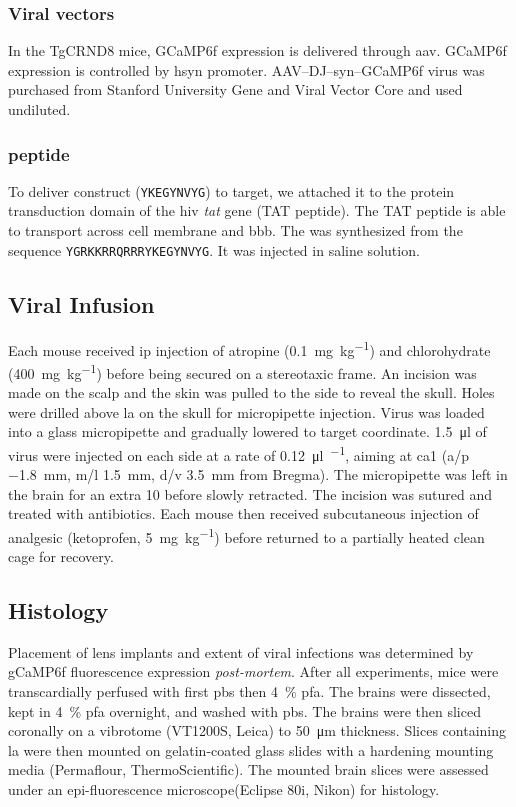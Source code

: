 \subsubsection{Viral vectors}
In the TgCRND8 mice, GCaMP6f expression is delivered through \gls{aav}. GCaMP6f expression is controlled by \gls{hsyn} promoter. AAV--DJ--syn--GCaMP6f virus was purchased from Stanford University Gene and Viral Vector Core and used undiluted. 

\subsubsection{\tglu{} peptide}
To deliver \glu{} construct (\texttt{YKEGYNVYG}) to target, we attached it to the protein transduction domain of the \gls{hiv} \textit{tat} gene (TAT peptide). The TAT peptide is able to transport across cell membrane and \gls{bbb}. The \tglu{} was synthesized from the sequence \texttt{YGRKKRRQRRRYKEGYNVYG}. It was injected in saline solution.


\subsection{Viral Infusion}

Each mouse received \gls{ip} injection of atropine (\SI{0.1}{\mg\per\kg}) and chlorohydrate (\SI{400}{\mg\per\kg}) before being secured on a stereotaxic frame. An incision was made on the scalp and the skin was pulled to the side to reveal the skull. Holes were drilled above \gls{la} on the skull for micropipette injection. Virus was loaded into a glass micropipette and gradually lowered to target coordinate. \SI{1.5}{\ul} of virus were injected on each side at a rate of \SI{0.12}{\ul\per\min}, aiming at \gls{ca1} (\gls{a/p} \SI{-1.8}{\mm}, \gls{m/l} \SI{1.5}{\mm}, \gls{d/v} \SI{3.5}{\mm} from Bregma). The micropipette was left in the brain for an extra \SI{10}{\min} before slowly retracted. The incision was sutured and treated with antibiotics. Each mouse then received subcutaneous injection of analgesic (ketoprofen, \SI{5}{\mg\per\kg}) before returned to a partially heated clean cage for recovery.

\subsection{Histology}
Placement of lens implants and extent of viral infections was determined by gCaMP6f fluorescence expression \textit{post-mortem}. After all experiments, mice were transcardially perfused with first \gls{pbs} then \SI{4}{\percent} \gls{pfa}. The brains were dissected,  kept in \SI{4}{\percent} \gls{pfa} overnight, and washed with \gls{pbs}. The brains were then sliced coronally on a vibrotome (VT1200S, Leica) to \SI{50}{\um} thickness. Slices containing \gls{la} were then mounted on gelatin-coated glass slides with a hardening mounting media (Permaflour, ThermoScientific). The mounted brain slices were assessed under an epi-fluorescence microscope(Eclipse 80i, Nikon) for histology.


